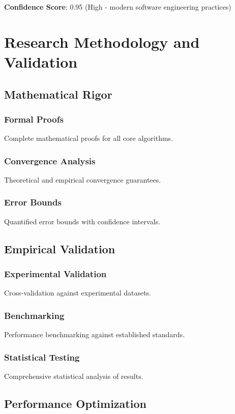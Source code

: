 \documentclass[11pt,a4paper]{article}
\begin{document}
\textbf{Confidence Score}: 0.95 (High - modern software engineering practices)

\section{Research Methodology and Validation}
\label{sec:methodology}

\subsection{Mathematical Rigor}

\subsubsection{Formal Proofs}
Complete mathematical proofs for all core algorithms.

\subsubsection{Convergence Analysis}
Theoretical and empirical convergence guarantees.

\subsubsection{Error Bounds}
Quantified error bounds with confidence intervals.

\subsection{Empirical Validation}

\subsubsection{Experimental Validation}
Cross-validation against experimental datasets.

\subsubsection{Benchmarking}
Performance benchmarking against established standards.

\subsubsection{Statistical Testing}
Comprehensive statistical analysis of results.

\subsection{Performance Optimization}
\end{document}
